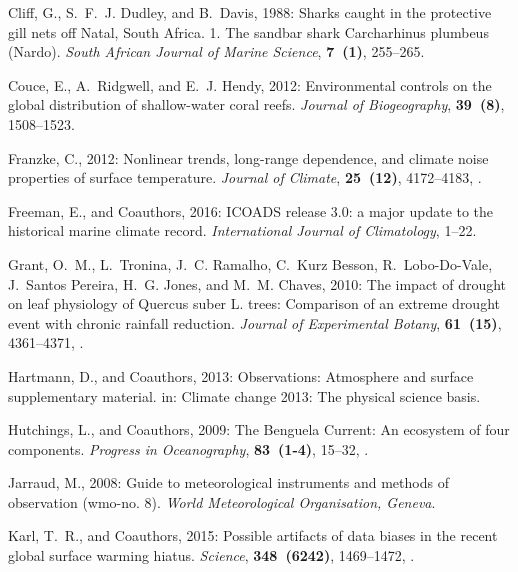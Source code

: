 \documentclass[]{ametsoc}
\begin{document}
\begin{thebibliography}{41}
Cliff, G., S.~F.~J. Dudley, and B.~Davis, 1988: {Sharks caught in the
  protective gill nets off Natal, South Africa. 1. The sandbar shark
  Carcharhinus plumbeus (Nardo)}. \textit{South African Journal of Marine
  Science}, \textbf{7~(1)}, 255--265.

Couce, E., A.~Ridgwell, and E.~J. Hendy, 2012: {Environmental controls on the
  global distribution of shallow-water coral reefs}. \textit{Journal of
  Biogeography}, \textbf{39~(8)}, 1508--1523.

Franzke, C., 2012: {Nonlinear trends, long-range dependence, and climate noise
  properties of surface temperature}. \textit{Journal of Climate},
  \textbf{25~(12)}, 4172--4183, .

Freeman, E., and Coauthors, 2016: {ICOADS release 3.0: a major update to the
  historical marine climate record}. \textit{International Journal of
  Climatology}, 1--22.

Grant, O.~M., L.~Tronina, J.~C. Ramalho, C.~{Kurz Besson}, R.~Lobo-Do-Vale,
  J.~{Santos Pereira}, H.~G. Jones, and M.~M. Chaves, 2010: {The impact of
  drought on leaf physiology of Quercus suber L. trees: Comparison of an
  extreme drought event with chronic rainfall reduction}. \textit{Journal of
  Experimental Botany}, \textbf{61~(15)}, 4361--4371, .

Hartmann, D., and Coauthors, 2013: Observations: Atmosphere and surface
  supplementary material. in: Climate change 2013: The physical science basis.

Hutchings, L., and Coauthors, 2009: {The Benguela Current: An ecosystem of four
  components}. \textit{Progress in Oceanography}, \textbf{83~(1-4)}, 15--32,
  .

Jarraud, M., 2008: Guide to meteorological instruments and methods of
  observation (wmo-no. 8). \textit{World Meteorological Organisation, Geneva}.

Karl, T.~R., and Coauthors, 2015: {Possible artifacts of data biases in the
  recent global surface warming hiatus}. \textit{Science}, \textbf{348~(6242)},
  1469--1472, .


\end{thebibliography}
\end{document}
